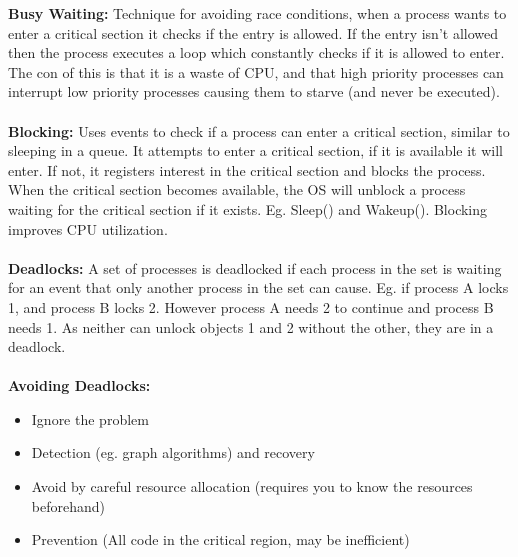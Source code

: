 \documentclass[a4paper,10pt]{article}
\begin{document}
\textcolor{CarnationPink}{\textbf{Busy Waiting:}} Technique for avoiding race conditions, when a process wants to enter a critical section it checks if the entry is allowed. If the entry isn't allowed then the process executes a loop which constantly checks if it is allowed to enter. The con of this is that it is a waste of CPU, and that high priority processes can interrupt low priority processes causing them to starve (and never be executed). \\\\
\newpage
\noindent \textcolor{CarnationPink}{\textbf{Blocking:}} Uses events to check if a process can enter a critical section, similar to sleeping in a queue. It attempts to enter a critical section, if it is available it will enter. If not, it registers interest in the critical section and blocks the process. When the critical section becomes available, the OS will unblock a process waiting for the critical section if it exists. Eg. Sleep() and Wakeup(). Blocking improves CPU utilization. \\\\
\textcolor{CarnationPink}{\textbf{Deadlocks:}} A set of processes is deadlocked if each process in the set is waiting for an event that only another process in the set can cause. Eg. if process A locks 1, and process B locks 2. However process A needs 2 to continue and process B needs 1. As neither can unlock objects 1 and 2 without the other, they are in a deadlock. \\\\
\textcolor{CarnationPink}{\textbf{Avoiding Deadlocks:}}
\begin{itemize}
\item Ignore the problem 
\item Detection (eg. graph algorithms) and recovery
\item Avoid by careful resource allocation (requires you to know the resources beforehand)
\item Prevention (All code in the critical region, may be inefficient)
\end{itemize}
\end{document}
